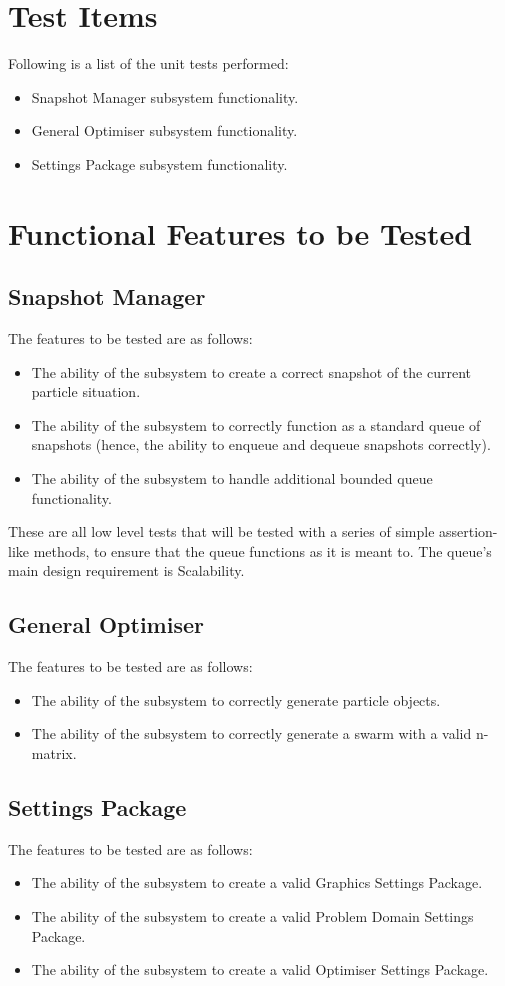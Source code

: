 \documentclass[11pt]{article}
\begin{document}
\section{Test Items}
Following is a list of the unit tests performed:
\begin{itemize}
    \item Snapshot Manager subsystem functionality.
    \item General Optimiser subsystem functionality.
    \item Settings Package subsystem functionality.
\end{itemize}

\section{Functional Features to be Tested}
\subsection{Snapshot Manager}
The features to be tested are as follows:
\begin{itemize}
    \item The ability of the subsystem to create a correct snapshot of the current particle situation.
    \item The ability of the subsystem to correctly function as a standard queue of snapshots (hence, the ability to enqueue and dequeue snapshots correctly).
    \item The ability of the subsystem to handle additional bounded queue functionality.
\end{itemize}
These are all low level tests that will be tested with a series of simple assertion-like methods, to ensure that the queue functions as it is meant to. The queue's main design requirement is Scalability.

\subsection{General Optimiser}
The features to be tested are as follows:
\begin{itemize}
    \item The ability of the subsystem to correctly generate particle objects.
    \item The ability of the subsystem to correctly generate a swarm with a valid n-matrix.
\end{itemize}


\subsection{Settings Package}
The features to be tested are as follows:
\begin{itemize}
    \item The ability of the subsystem to create a valid Graphics Settings Package.
    \item The ability of the subsystem to create a valid Problem Domain Settings Package.
    \item The ability of the subsystem to create a valid Optimiser Settings Package.
\end{itemize}
\end{document}
